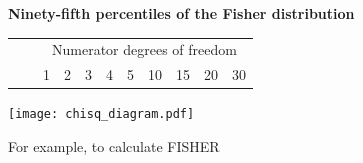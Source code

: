 \documentclass[a4paper]{article}
\begin{document}
\begin{center}
  {\Large\bf Ninety-fifth percentiles of the Fisher distribution}
\end{center}

\rule{0mm}{5mm}
\pagestyle{empty}
\thispagestyle{empty}
\begin{table}[ht]
\centering
\begin{tabular}{rr|ccccccccc}
  &&\multicolumn{9}{c}{Numerator degrees of freedom\rule[-4mm]{0mm}{4mm}}\\
  & & {\large 1} & {\large 2} & {\large 3} & {\large 4} & {\large 5} & {\large 10} &{\large 15} &{\large 20}& {\large 30}\\  \hline

  \hline
\end{tabular}
\end{table}

\begin{centering}
\texttt{[image: chisq\_diagram.pdf]}
\end{centering}

\noindent For example, to calculate {\large FISHER}
\\
\end{document}

